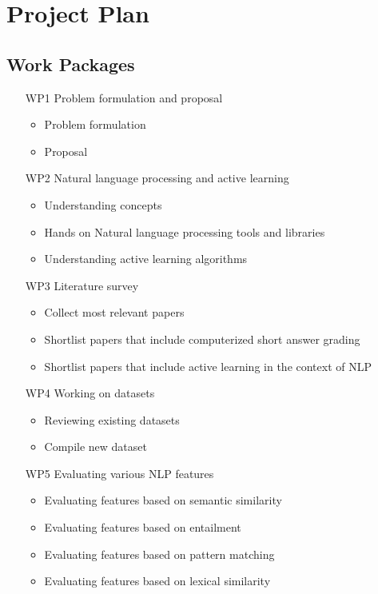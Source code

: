 \documentclass[rnd]{mas_proposal}
\begin{document}
\chapter{Project Plan}

\section{Work Packages}
\begin{enumerate}
    \item[WP1] Problem formulation and proposal
    \begin{itemize}
    \item Problem formulation
    \item Proposal
    \end{itemize}
    \item[WP2] Natural language processing and active learning
    \begin{itemize}
    \item Understanding concepts
    \item Hands on Natural language processing tools and libraries
    \item Understanding active learning algorithms
    \end{itemize}
    \item[WP3] Literature survey
    \begin{itemize}
    \item Collect most relevant papers
    \item Shortlist papers that include computerized short answer grading
    \item Shortlist papers that include active learning in the context of NLP
    \end{itemize}
    \item[WP4] Working on datasets
    \begin{itemize}
    \item Reviewing existing datasets
    \item Compile new dataset
    \end{itemize}
	\item[WP5] Evaluating various NLP features
	\begin{itemize}
    \item Evaluating features based on semantic similarity
    \item Evaluating features based on entailment
    \item Evaluating features based on pattern matching
    \item Evaluating features based on lexical similarity

\end{itemize}
\end{enumerate}
\end{document}
